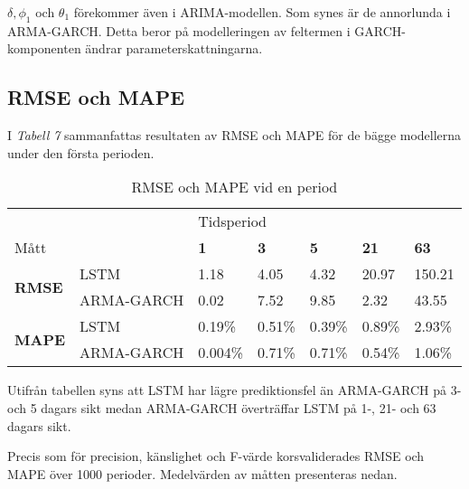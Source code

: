 \documentclass[11pt]{article}
\begin{document}
$\delta, \phi_1$ och $\theta_1$ förekommer även i ARIMA-modellen. Som synes är de annorlunda i ARMA-GARCH. Detta beror på modelleringen av feltermen i GARCH-komponenten ändrar parameterskattningarna.

\subsection{RMSE och MAPE}
I \emph{Tabell 7} sammanfattas resultaten av RMSE och MAPE för de bägge modellerna under den första perioden.

\begin{table}[H]
\caption{RMSE och MAPE vid en period}
\begin{tabular}{||lllllll||}
\hline
                                     &            & \multicolumn{5}{l||}{Tidsperiod}                                  \\
Mått                                 &            & \textbf{1} & \textbf{3} & \textbf{5} & \textbf{21} & \textbf{63} \\ \hline\hline
\multirow{2}{*}{\textbf{RMSE}}  & LSTM       & 1.18          & 4.05         & 4.32          & 20.97           & 150.21        \\
                                & ARMA-GARCH & 0.02          & 7.52         & 9.85          & 2.32            & 43.55           \\ \cline{2-7} 
\multirow{2}{*}{\textbf{MAPE}}  & LSTM       & 0.19\%        & 0.51\%       & 0.39\%        & 0.89\%          & 2.93\%        \\
                                & ARMA-GARCH & 0.004\%        & 0.71\%       & 0.71\%        & 0.54\%          & 1.06\%        \\ \hline
\end{tabular}
\end{table}

Utifrån tabellen syns att LSTM har lägre prediktionsfel än ARMA-GARCH på 3- och 5 dagars sikt medan ARMA-GARCH överträffar LSTM på 1-, 21- och 63 dagars sikt.

Precis som för precision, känslighet och F-värde korsvaliderades RMSE och MAPE över 1000 perioder. Medelvärden av måtten presenteras nedan. 
\end{document}
